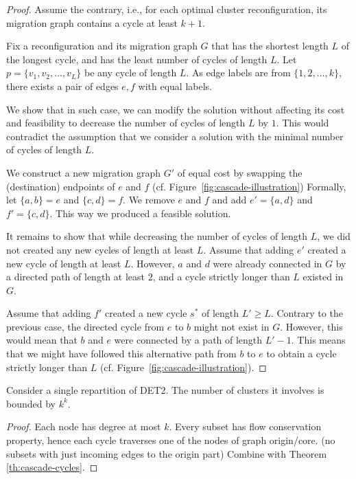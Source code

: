 \documentclass[manuscript,screen=true, review, anonymous]{acmart}
\begin{document}
\begin{proof}
  Assume the contrary, i.e., for each optimal cluster reconfiguration, its migration graph contains a cycle at least $k+1$.

Fix a reconfiguration and its migration graph $G$ that has the shortest length $L$ of the longest cycle, and has the least number of cycles of length $L$.
Let $p = \lbrace v_1, v_2, \ldots, v_L \rbrace$ be any cycle of length $L$.
As edge labels are from $\{ 1, 2, \ldots, k \}$, there exists a pair of edges $e, f$ with equal labels.

We show that in such case, we can modify the solution without affecting its cost and feasibility to decrease the number of cycles of length $L$ by $1$.
This would contradict the assumption that we consider a solution with the minimal number of cycles of length $L$.

We construct a new migration graph $G'$ of equal cost by swapping the (destination) endpoints of $e$ and $f$ (cf. Figure~\ref{fig:cascade-illustration})
Formally, let $\lbrace a, b \rbrace = e$ and $\lbrace c, d \rbrace = f$.
We remove $e$ and $f$ and add $e' = \lbrace a, d \rbrace$ and $f' = \lbrace c, d \rbrace$.
This way we produced a feasible solution.

It remains to show that while decreasing the number of cycles of length $L$, we did not created any new cycles of length at least $L$.
Assume that adding $e'$ created a new cycle of length at least $L$.
However, $a$ and $d$ were already connected in $G$ by a directed path of length at least $2$, and a cycle strictly longer than $L$ existed in $G$.

Assume that adding $f'$ created a new cycle $s^*$ of length $L' \geq L$.
Contrary to the previous case, the directed cycle from $e$ to $b$ might not exist in $G$.
However, this would mean that $b$ and $e$ were connected by a path of length $L'-1$.
This means that we might have followed this alternative path from $b$ to $e$ to obtain a cycle strictly longer than $L$ (cf. Figure~\ref{fig:cascade-illustration}).

\end{proof}


\begin{theorem}
  Consider a single repartition of DET2.
  The number of clusters it involves is bounded by $k^k$.
  \label{th:cascade}
\end{theorem}

\begin{proof}
  Each node has degree at most $k$.
  Every subset has flow conservation property, hence each cycle traverses one of the nodes of graph origin/core. (no subsets with just incoming edges to the origin part)
  Combine with Theorem \ref{th:cascade-cycles}.

\end{proof}
\end{document}
